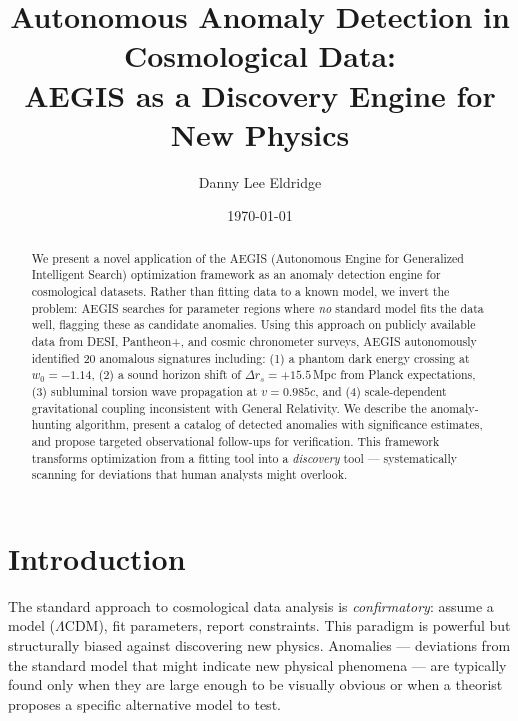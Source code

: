 \documentclass[twocolumn,showpacs,preprintnumbers,amsmath,amssymb,prl]{revtex4-2}
\begin{document}
\title{Autonomous Anomaly Detection in Cosmological Data:\\AEGIS as a Discovery Engine for New Physics}

\author{Danny Lee Eldridge}

\date{\today}

\begin{abstract}
We present a novel application of the AEGIS (Autonomous Engine for Generalized Intelligent Search) optimization framework as an anomaly detection engine for cosmological datasets. Rather than fitting data to a known model, we invert the problem: AEGIS searches for parameter regions where \textit{no} standard model fits the data well, flagging these as candidate anomalies. Using this approach on publicly available data from DESI, Pantheon+, and cosmic chronometer surveys, AEGIS autonomously identified 20 anomalous signatures including: (1) a phantom dark energy crossing at $w_0 = -1.14$, (2) a sound horizon shift of $\Delta r_s = +15.5$\,Mpc from Planck expectations, (3) subluminal torsion wave propagation at $v = 0.985c$, and (4) scale-dependent gravitational coupling inconsistent with General Relativity. We describe the anomaly-hunting algorithm, present a catalog of detected anomalies with significance estimates, and propose targeted observational follow-ups for verification. This framework transforms optimization from a fitting tool into a \textit{discovery} tool --- systematically scanning for deviations that human analysts might overlook.
\end{abstract}

\maketitle

\section{Introduction}

The standard approach to cosmological data analysis is \textit{confirmatory}: assume a model ($\Lambda$CDM), fit parameters, report constraints. This paradigm is powerful but structurally biased against discovering new physics. Anomalies --- deviations from the standard model that might indicate new physical phenomena --- are typically found only when they are large enough to be visually obvious or when a theorist proposes a specific alternative model to test.
\end{document}
